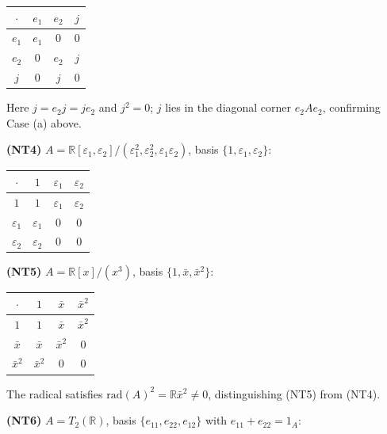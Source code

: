 \documentclass{amsart}
\theoremstyle{plain}
\theoremstyle{definition}
\theoremstyle{remark}
\newcommand{\RR}{\mathbb{R}}
\newcommand{\Jac}{\mathrm{rad}}
\begin{document}
\begin{center}
\renewcommand{\arraystretch}{1.2}
\begin{tabular}{c|ccc}
  $\cdot$ & $e_1$ & $e_2$ & $j$ \\\hline
  $e_1$ & $e_1$ & $0$   & $0$ \\
  $e_2$ & $0$   & $e_2$ & $j$ \\
  $j$   & $0$   & $j$   & $0$ \\
\end{tabular}
\end{center}
Here $j = e_2 j = j e_2$ and $j^2 = 0$;
$j$ lies in the diagonal corner $e_2 A e_2$, confirming Case (a) above.

\medskip\noindent
\textbf{(NT4)} $A = \RR[\varepsilon_1,\varepsilon_2]/(\varepsilon_1^2, \varepsilon_2^2, \varepsilon_1 \varepsilon_2)$,
basis $\{1, \varepsilon_1, \varepsilon_2\}$:

\begin{center}
\renewcommand{\arraystretch}{1.2}
\begin{tabular}{c|ccc}
  $\cdot$ & $1$ & $\varepsilon_1$ & $\varepsilon_2$ \\\hline
  $1$          & $1$          & $\varepsilon_1$ & $\varepsilon_2$ \\
  $\varepsilon_1$ & $\varepsilon_1$ & $0$ & $0$ \\
  $\varepsilon_2$ & $\varepsilon_2$ & $0$ & $0$ \\
\end{tabular}
\end{center}

\medskip\noindent
\textbf{(NT5)} $A = \RR[x]/(x^3)$, basis $\{1, \bar x, \bar x^2\}$:

\begin{center}
\renewcommand{\arraystretch}{1.2}
\begin{tabular}{c|ccc}
  $\cdot$ & $1$ & $\bar x$ & $\bar x^2$ \\\hline
  $1$         & $1$        & $\bar x$   & $\bar x^2$ \\
  $\bar x$    & $\bar x$   & $\bar x^2$ & $0$ \\
  $\bar x^2$  & $\bar x^2$ & $0$        & $0$ \\
\end{tabular}
\end{center}
The radical satisfies $\Jac(A)^2 = \RR\bar x^2 \neq 0$,
distinguishing (NT5) from (NT4).

\medskip\noindent
\textbf{(NT6)} $A = T_2(\RR)$,
basis $\{e_{11}, e_{22}, e_{12}\}$ with $e_{11} + e_{22} = 1_A$:
\end{document}
